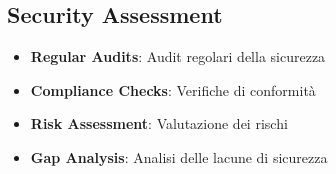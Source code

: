 \subsection{Security Assessment}
\begin{itemize}
    \item \textbf{Regular Audits}: Audit regolari della sicurezza
    \item \textbf{Compliance Checks}: Verifiche di conformità
    \item \textbf{Risk Assessment}: Valutazione dei rischi
    \item \textbf{Gap Analysis}: Analisi delle lacune di sicurezza
\end{itemize}
